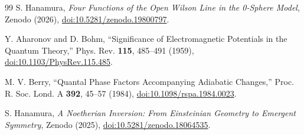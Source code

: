 \documentclass[%
 reprint, amsmath,amssymb, aps, prb, ]{revtex4-2}
\numberwithin{equation}{section}
\begin{document}
\begin{thebibliography}{99}
S. Hanamura, \emph{Four Functions of the Open Wilson Line in the 0-Sphere Model}, Zenodo (2026), \href{https://doi.org/10.5281/zenodo.19800797}{doi:10.5281/zenodo.19800797}.

Y. Aharonov and D. Bohm, ``Significance of Electromagnetic Potentials in the Quantum Theory,'' Phys. Rev. \textbf{115}, 485--491 (1959), \href{https://doi.org/10.1103/PhysRev.115.485}{doi:10.1103/PhysRev.115.485}.

M. V. Berry, ``Quantal Phase Factors Accompanying Adiabatic Changes,'' Proc. R. Soc. Lond. A \textbf{392}, 45--57 (1984), \href{https://doi.org/10.1098/rspa.1984.0023}{doi:10.1098/rspa.1984.0023}.

S. Hanamura, \emph{A Noetherian Inversion: From Einsteinian Geometry to Emergent Symmetry}, Zenodo (2025), \href{https://doi.org/10.5281/zenodo.18064535}{doi:10.5281/zenodo.18064535}.

\end{thebibliography}

\end{document}
